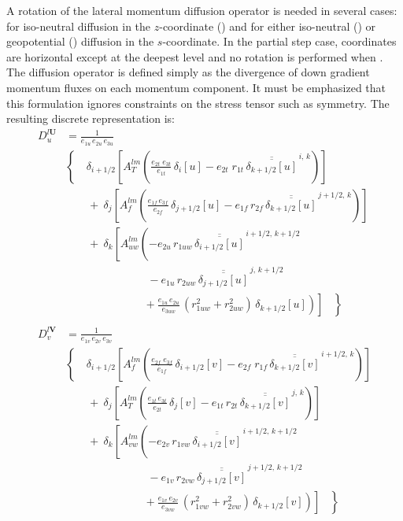 \documentclass[../tex_main/NEMO_manual]{subfiles}
\begin{document}
A rotation of the lateral momentum diffusion operator is needed in several cases: 
for iso-neutral diffusion in the $z$-coordinate () and for 
either iso-neutral () or geopotential 
() diffusion in the $s$-coordinate. In the partial step 
case, coordinates are horizontal except at the deepest level and no 
rotation is performed when . The diffusion operator 
is defined simply as the divergence of down gradient momentum fluxes on each 
momentum component. It must be emphasized that this formulation ignores 
constraints on the stress tensor such as symmetry. The resulting discrete 
representation is:
\begin{equation} \label{eq:dyn_ldf_iso}
\begin{split}
 D_u^{l\textbf{U}} &= \frac{1}{e_{1u} \, e_{2u} \, e_{3u} }	\\
&  \left\{\quad  {\delta _{i+1/2} \left[ {A_T^{lm}  \left( 
	 {\frac{e_{2t} \; e_{3t} }{e_{1t} } \,\delta _{i}[u]
	-e_{2t} \; r_{1t} \,\overline{\overline {\delta _{k+1/2}[u]}}^{\,i,\,k}}
 \right)} \right]} 	\right.
\\ 
& \qquad +\ \delta_j \left[ {A_f^{lm} \left( {\frac{e_{1f}\,e_{3f} }{e_{2f} 
}\,\delta _{j+1/2} [u] - e_{1f}\, r_{2f} 
\,\overline{\overline {\delta _{k+1/2} [u]}} ^{\,j+1/2,\,k}} 
\right)} \right] 
\\ 
&\qquad +\ \delta_k \left[ {A_{uw}^{lm} \left( {-e_{2u} \, r_{1uw} \,\overline{\overline 
{\delta_{i+1/2} [u]}}^{\,i+1/2,\,k+1/2} } 
\right.} \right. 
\\ 
&  \ \qquad \qquad \qquad \quad\ 
- e_{1u} \, r_{2uw} \,\overline{\overline {\delta_{j+1/2} [u]}} ^{\,j,\,k+1/2}
\\ 
& \left. {\left. { \ \qquad \qquad \qquad \ \ \ \left. {\ 
+\frac{e_{1u}\, e_{2u} }{e_{3uw} }\,\left( {r_{1uw}^2+r_{2uw}^2} 
\right)\,\delta_{k+1/2} [u]} \right)} \right]\;\;\;} \right\} 
\\
\\
 D_v^{l\textbf{V}} &= \frac{1}{e_{1v} \, e_{2v} \, e_{3v} }    \\
&  \left\{\quad  {\delta _{i+1/2} \left[ {A_f^{lm}  \left( 
	 {\frac{e_{2f} \; e_{3f} }{e_{1f} } \,\delta _{i+1/2}[v]
	-e_{2f} \; r_{1f} \,\overline{\overline {\delta _{k+1/2}[v]}}^{\,i+1/2,\,k}}
 \right)} \right]} 	\right.
\\ 
& \qquad +\ \delta_j \left[ {A_T^{lm} \left( {\frac{e_{1t}\,e_{3t} }{e_{2t} 
}\,\delta _{j} [v] - e_{1t}\, r_{2t} 
\,\overline{\overline {\delta _{k+1/2} [v]}} ^{\,j,\,k}} 
\right)} \right] 
\\ 
& \qquad +\ \delta_k \left[ {A_{vw}^{lm} \left( {-e_{2v} \, r_{1vw} \,\overline{\overline 
{\delta_{i+1/2} [v]}}^{\,i+1/2,\,k+1/2} }\right.} \right. 
\\
&  \ \qquad \qquad \qquad \quad\ 
- e_{1v} \, r_{2vw} \,\overline{\overline {\delta_{j+1/2} [v]}} ^{\,j+1/2,\,k+1/2}
\\ 
& \left. {\left. { \ \qquad \qquad \qquad \ \ \ \left. {\ 
+\frac{e_{1v}\, e_{2v} }{e_{3vw} }\,\left( {r_{1vw}^2+r_{2vw}^2} 
\right)\,\delta_{k+1/2} [v]} \right)} \right]\;\;\;} \right\} 
 \end{split}
\end{equation}
\end{document}
